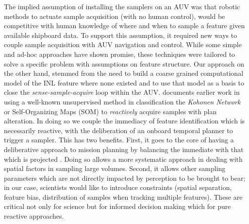 The implied assumption of installing the samplers on an AUV was that
robotic methods to actuate sample acquisition (with no human control),
would be competitive with human knowledge of where and when to sample
a feature given available shipboard data. To support this assumption,
it required new ways to couple sample acquisition with AUV navigation
and control. While some simple and ad-hoc approaches \cite{yanwu10,
  yanwu11} have shown promise, these techniques were tailored to solve
a specific problem with assumptions on feature structure.  Our
approach on the other hand, stemmed from the need to build a coarse
grained computational model of the INL feature where none existed and
to use that model as a basis to close the \emph{sense-sample-acquire}
loop within the AUV. \cite{fox2007} documents earlier work in using a
well-known unsupervised method in classification the \emph{Kohonen
  Network} or Self-Organizing Maps (SOM) \cite{kohonen} to
\emph{reactively} acquire samples with plan alteration. In doing so we
couple the immediacy of feature identification which is necessarily
reactive, with the deliberation of an onboard temporal planner to
trigger a sampler. This has two benefits. First, it goes to the core
of having a deliberative approach to mission planning by balancing the
immediate with that which is projected \cite{olaya11}. Doing so allows
a more systematic approach in dealing with spatial factors in sampling
large volumes. Second, it allows other sampling parameters which are
not directly impacted by perception to be brought to bear; in our
case, scientists would like to introduce constraints (spatial
separation, feature bias, distribution of samples when tracking
multiple features). These are critical not only for science but for
informed decision making which  for pure
reactive approaches.

